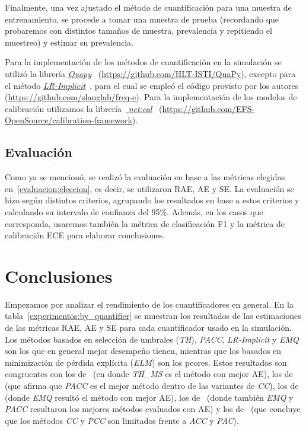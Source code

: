 Finalmente, una vez ajustado el método de cuantificación para una muestra de
entrenamiento, se procede a tomar una muestra de prueba (recordando que
probaremos con distintos tamaños de muestra, prevalencia y repitiendo el
muestreo) y estimar su prevalencia.

Para la implementación de los métodos de cuantificación en la simulación se
utilizó la librería \href{https://github.com/HLT-ISTI/QuaPy}{{\it
Quapy}}~\cite{moreo2021quapy} (\url{https://github.com/HLT-ISTI/QuaPy}), excepto
para el método \href{https://github.com/slanglab/freq-e}{{\it
LR-Implicit}}~\cite{keith2018uncertainty}, para el cual se empleó el código
provisto por los autores (\url{https://github.com/slanglab/freq-e}). Para la
implementación de los modelos de calibración utilizamos la
librería~\href{https://github.com/EFS-OpenSource/calibration-framework}{{\it
net:cal}}~\cite{kuppers2020multivariate}
(\url{https://github.com/EFS-OpenSource/calibration-framework}).

\subsection{Evaluación}\label{experimentos:evaluación}

Como ya se mencionó, se realizó la evaluación en base a las métricas elegidas
en~\ref{evaluacion:eleccion}, es decir, se utilizaron RAE, AE y SE. La
evaluación se hizo según distintos criterios, agrupando los resultados en base a
estos criterios y calculando su intervalo de confianza del 95\%. Además, en los
casos que corresponda, usaremos también la métrica de clasificación F1 y la
métrica de calibración ECE para elaborar conclusiones.

\section{Conclusiones}\label{experimentos:conclusiones}

Empezamos por analizar el rendimiento de los cuantificadores en general. En la
tabla~\ref{experimentos:by_quantifier} se muestran los resultados de las
estimaciones de las métricas RAE, AE y SE para cada cuantificador usado en la
simulación. Los métodos basados en selección de umbrales ({\it TH\/}), {\it
PACC\/}, {\it LR-Implicit\/} y {\it EMQ\/} son los que en general mejor
desempeño tienen, mientras que los basados en minimización de pérdida explícita
({\it ELM\/}) son los peores. Estos resultados son congruentes con los
de~\citet{schumacher2021comparative} (en donde {\it TH\_MS\/} es el método con
mejor AE), los de~\citet{moreo2021re} (que afirma que {\it PACC\/} es el mejor
método dentro de las variantes de {\it CC\/}), los de~\citet{moreo2021quapy}
(donde {\it EMQ\/} resultó el método con mejor AE), los
de~\citet{moreo2022tweet} (donde también {\it EMQ\/} y {\it PACC\/} resultaron
los mejores métodos evaluados con AE) y los de~\citet{tasche2016does} (que
concluye que los métodos {\it CC\/} y {\it PCC\/} son limitados frente a {\it
ACC\/} y {\it PAC\/}).

